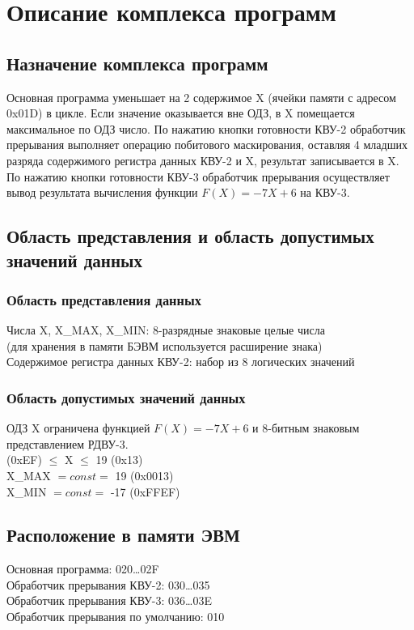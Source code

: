 \section{Описание комплекса программ}
\subsection{Назначение комплекса программ}
Основная программа уменьшает на 2 содержимое X (ячейки памяти с адресом 0x01D) в цикле. Если значение оказывается вне ОДЗ, в X помещается максимальное по ОДЗ число. По нажатию кнопки готовности КВУ-2 обработчик прерывания выполняет операцию побитового маскирования, оставляя 4 младших разряда содержимого регистра данных КВУ-2 и X, результат записывается в X. По нажатию кнопки готовности КВУ-3 обработчик прерывания осуществляет вывод результата вычисления функции $F(X)=-7X+6$ на КВУ-3.

\subsection{Область представления и область допустимых значений данных}
\subsubsection{Область представления данных}
\noindent Числа X, X\_MAX, X\_MIN: 8-разрядные знаковые целые числа\\
(для хранения в памяти БЭВМ используется расширение знака)\\
Содержимое регистра данных КВУ-2: набор из 8 логических значений

\subsubsection{Область допустимых значений данных}
\noindent ОДЗ X ограничена функцией $F(X)=-7X+6$ и 8-битным знаковым представлением РДВУ-3.\\

 (0xEF) $\leqslant$ X $\leqslant$ 19 (0x13)\\
X\_MAX $=const=$ 19 (0x0013)\\
X\_MIN $=const=$ -17 (0xFFEF)

\subsection{Расположение в памяти ЭВМ}
\noindent Основная программа: 020\ldots02F\\
Обработчик прерывания КВУ-2: 030\ldots035\\
Обработчик прерывания КВУ-3: 036\ldots03E\\
Обработчик прерывания по умолчанию: 010\\

